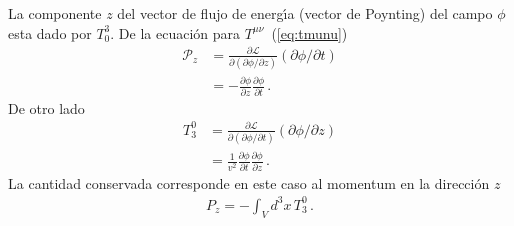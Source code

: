 La componente $z$ del vector de flujo de energ\'\i a (vector de Poynting)
del campo $\phi$ esta dado por $T^3_0$. De la ecuaci\'on para
$T^{\mu\nu}$~(\ref{eq:tmunu})
\begin{align}
  \mathcal{P}_z&=\frac{\partial\mathcal{L}}{\partial(\partial\phi/\partial z)}(\partial\phi/\partial t)\nonumber\\
&=-\frac{\partial\phi}{\partial z}\frac{\partial\phi}{\partial t}\,.
\end{align}
De otro lado
\begin{align}
  T^0_3&=\frac{\partial\mathcal{L}}{\partial(\partial\phi/\partial t)}(\partial\phi/\partial z)\nonumber\\
&=\frac{1}{v^2}\frac{\partial\phi}{\partial t}\frac{\partial\phi}{\partial z}\,.
\end{align}
La cantidad conservada corresponde en este caso al momentum en la direcci\'on $z$
\begin{align}
  P_z=-\int_V d^3x\,T^0_3\,.
\end{align}

